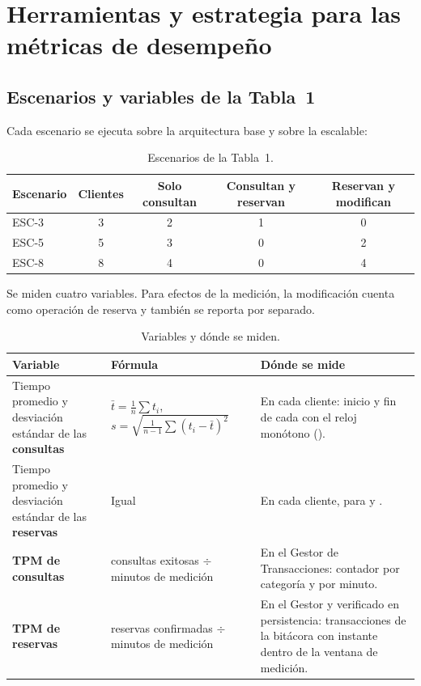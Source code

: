 \section{Herramientas y estrategia para las métricas de desempeño}
\label{sec:metricas}

\subsection{Escenarios y variables de la Tabla~1}

Cada escenario se ejecuta sobre la arquitectura base y sobre la escalable:

\begin{table}[H]
\centering
\caption{Escenarios de la Tabla~1.}
\begin{tabular}{lcccc}
\toprule
Escenario & Clientes & Solo consultan & Consultan y reservan & Reservan y modifican \\
\midrule
ESC-3 & 3 & 2 & 1 & 0 \\
ESC-5 & 5 & 3 & 0 & 2 \\
ESC-8 & 8 & 4 & 0 & 4 \\
\bottomrule
\end{tabular}
\end{table}

Se miden cuatro variables. Para efectos de la medición, la modificación cuenta
como operación de reserva y también se reporta por separado.

\begin{table}[H]
\centering
\caption{Variables y dónde se miden.}
\begin{tabularx}{\textwidth}{p{4.6cm}p{4.2cm}Y}
\toprule
Variable & Fórmula & Dónde se mide \\
\midrule
Tiempo promedio y desviación estándar de las \textbf{consultas} &
$\bar{t}=\frac{1}{n}\sum t_i$, \ $s=\sqrt{\frac{1}{n-1}\sum (t_i-\bar{t})^2}$ &
En cada cliente: inicio y fin de cada  con el reloj
monótono (). \\
Tiempo promedio y desviación estándar de las \textbf{reservas} & Igual &
En cada cliente, para  y . \\
\textbf{TPM de consultas} & consultas exitosas $\div$ minutos de medición &
En el Gestor de Transacciones: contador por categoría y por minuto. \\
\textbf{TPM de reservas} & reservas confirmadas $\div$ minutos de medición &
En el Gestor y verificado en persistencia: transacciones de la bitácora con
instante dentro de la ventana de medición. \\
\bottomrule
\end{tabularx}
\end{table}


